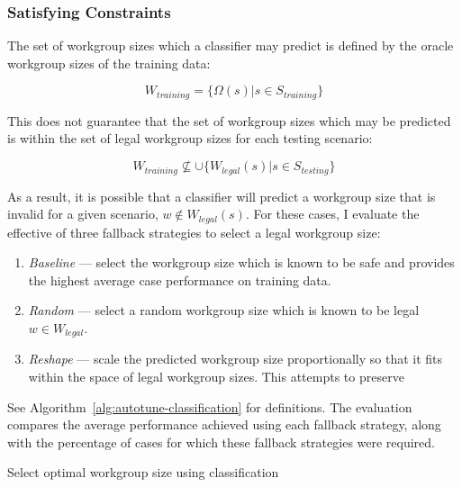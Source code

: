 \subsubsection{Satisfying Constraints}

The set of workgroup sizes which a classifier may predict is defined
by the oracle workgroup sizes of the training data:

\begin{equation}
W_{training} = \{ \Omega(s) | s \in S_{training} \}
\end{equation}

This does not guarantee that the set of workgroup sizes which may be
predicted is within the set of legal workgroup sizes for each testing
scenario:

\begin{equation}
W_{training} \nsubseteq \cup \{ W_{legal}(s) | s \in S_{testing} \}
\end{equation}

As a result, it is possible that a classifier will predict a workgroup
size that is invalid for a given scenario, $w \not\in W_{legal}(s)$.
For these cases, I evaluate the effective of three fallback strategies
to select a legal workgroup size:

\begin{enumerate}
\item \emph{Baseline} --- select the workgroup size which is known to
  be safe and provides the highest average case performance on
  training data.
\item \emph{Random} --- select a random workgroup size which is known
  to be legal $w \in W_{legal}$.
\item \emph{Reshape} --- scale the predicted workgroup size
  proportionally so that it fits within the space of legal workgroup
  sizes. This attempts to preserve
\end{enumerate}

See Algorithm~\ref{alg:autotune-classification} for definitions. The
evaluation compares the average performance achieved using each
fallback strategy, along with the percentage of cases for which these
fallback strategies were required.

\begin{algorithm}

\caption{Select optimal workgroup size using classification}
\label{alg:autotune-classification}
\end{algorithm}


